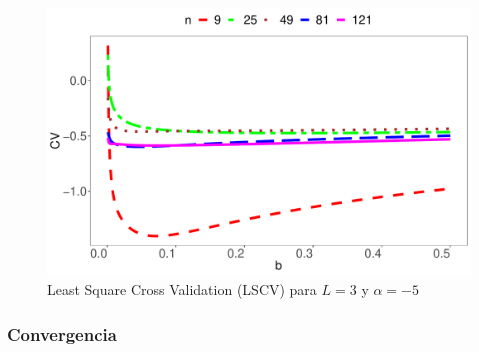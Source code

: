 \begin{figure}[hbt]
	\centering 
	\includegraphics[scale=0.5]{../../Figures/Tesis/Capitulo5/GraficoLSCValfa=-5.pdf}
	\caption{\label{LSCVgraf} Least Square Cross Validation (LSCV) para $L=3$ y $\alpha=-5$}
\end{figure}





\subsubsection{Convergencia}

